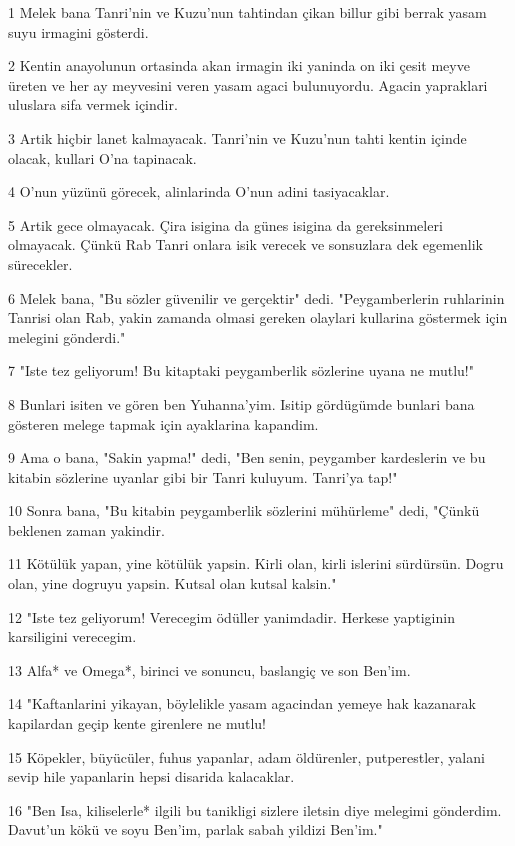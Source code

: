 \par 1 Melek bana Tanri'nin ve Kuzu'nun tahtindan çikan billur gibi berrak yasam suyu irmagini gösterdi.
\par 2 Kentin anayolunun ortasinda akan irmagin iki yaninda on iki çesit meyve üreten ve her ay meyvesini veren yasam agaci bulunuyordu. Agacin yapraklari uluslara sifa vermek içindir.
\par 3 Artik hiçbir lanet kalmayacak. Tanri'nin ve Kuzu'nun tahti kentin içinde olacak, kullari O'na tapinacak.
\par 4 O'nun yüzünü görecek, alinlarinda O'nun adini tasiyacaklar.
\par 5 Artik gece olmayacak. Çira isigina da günes isigina da gereksinmeleri olmayacak. Çünkü Rab Tanri onlara isik verecek ve sonsuzlara dek egemenlik sürecekler.
\par 6 Melek bana, "Bu sözler güvenilir ve gerçektir" dedi. "Peygamberlerin ruhlarinin Tanrisi olan Rab, yakin zamanda olmasi gereken olaylari kullarina göstermek için melegini gönderdi."
\par 7 "Iste tez geliyorum! Bu kitaptaki peygamberlik sözlerine uyana ne mutlu!"
\par 8 Bunlari isiten ve gören ben Yuhanna'yim. Isitip gördügümde bunlari bana gösteren melege tapmak için ayaklarina kapandim.
\par 9 Ama o bana, "Sakin yapma!" dedi, "Ben senin, peygamber kardeslerin ve bu kitabin sözlerine uyanlar gibi bir Tanri kuluyum. Tanri'ya tap!"
\par 10 Sonra bana, "Bu kitabin peygamberlik sözlerini mühürleme" dedi, "Çünkü beklenen zaman yakindir.
\par 11 Kötülük yapan, yine kötülük yapsin. Kirli olan, kirli islerini sürdürsün. Dogru olan, yine dogruyu yapsin. Kutsal olan kutsal kalsin."
\par 12 "Iste tez geliyorum! Verecegim ödüller yanimdadir. Herkese yaptiginin karsiligini verecegim.
\par 13 Alfa* ve Omega*, birinci ve sonuncu, baslangiç ve son Ben'im.
\par 14 "Kaftanlarini yikayan, böylelikle yasam agacindan yemeye hak kazanarak kapilardan geçip kente girenlere ne mutlu!
\par 15 Köpekler, büyücüler, fuhus yapanlar, adam öldürenler, putperestler, yalani sevip hile yapanlarin hepsi disarida kalacaklar.
\par 16 "Ben Isa, kiliselerle* ilgili bu tanikligi sizlere iletsin diye melegimi gönderdim. Davut'un kökü ve soyu Ben'im, parlak sabah yildizi Ben'im."
